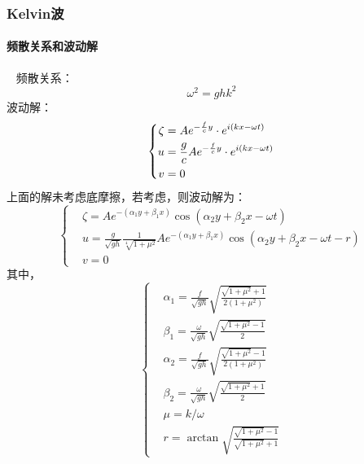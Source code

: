 \documentclass[a4paper,12pt]{article}
\begin{document}
    \subsubsection{Kelvin波}
	\paragraph{频散关系和波动解}~{}
	频散关系：
	$$\omega^2=ghk^2$$
	\indent
	波动解：
	\[
	\left\{
	\begin{aligned}
		\zeta & = A{e^{ - {f \over c}y}} \cdot {e^{i(kx - \omega t)}}\\
		u &= {g \over c}A{e^{ - {f \over c}y}} \cdot {e^{i(kx - \omega t)}}\\
		v&=0
	\end{aligned}	
	\right.
	\]
	\indent
	上面的解未考虑底摩擦，若考虑，则波动解为：
	\[
	\left\{
	\begin{aligned}
		&\zeta=A e^{-\left(\alpha_{1} y+\beta_{1} x\right)} \cos \left(\alpha_{2} y+\beta_{2} x-\omega t\right)\\
		&u=\frac{g}{\sqrt{g h}} \frac{1}{\sqrt[4]{1+\mu^{2}}} A e^{-\left(\alpha_{1} y+\beta_{1} x\right)} \cos \left(\alpha_{2} y+\beta_{2} x-\omega t-r\right)\\
		&v=0
	\end{aligned}
	\right.
	\]
	其中，
	\[
	\left\{
	\begin{aligned}
	&\alpha_{1}=\frac{f}{\sqrt{g h}} \sqrt{\frac{\sqrt{1+\mu^{2}}+1}{2\left(1+\mu^{2}\right)}}\\
	&\beta_{1}=\frac{\omega}{\sqrt{g h}} \sqrt{\frac{\sqrt{1+\mu^{2}}-1}{2}}\\
	&\alpha_{2}=\frac{f}{\sqrt{g h}} \sqrt{\frac{\sqrt{1+\mu^{2}}-1}{2\left(1+\mu^{2}\right)}}\\
	&\beta_{2}=\frac{\omega}{\sqrt{g h}} \sqrt{\frac{\sqrt{1+\mu^{2}}+1}{2}}\\
	&\mu=k/\omega\\
	&r=\arctan \sqrt{\frac{\sqrt{1+\mu^{2}}-1}{\sqrt{1+\mu^{2}}+1}}
	\end{aligned}
	\right.
	\]
	\newpage
\end{document}
